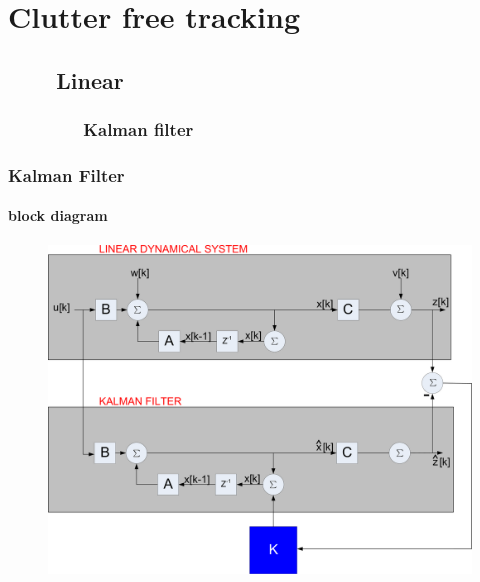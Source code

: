 \section{Clutter free tracking}
\subsection{\ \ \ \ Linear}


\subsubsection{\ \ \ \ \ \ \ \ Kalman filter}
\begin{frame}
\frametitle{Kalman Filter}
\framesubtitle{block diagram}
\logoCSIPCPL\mypagenum
	\begin{figure}
		\includegraphics[width=1.0\textwidth]{figs/TRK_KalmanFilter_blockDiagram.pdf}
	\end{figure}
\end{frame}



